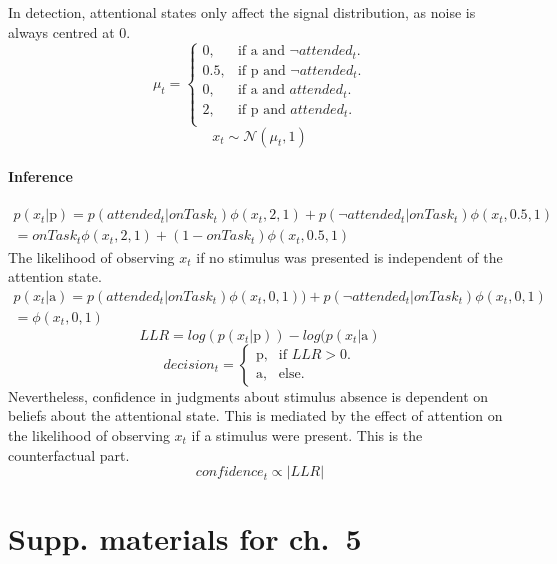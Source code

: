 \documentclass[12pt,twoside]{reedthesis}
\begin{document}
In detection, attentional states only affect the signal distribution, as noise is always centred at 0.
\begin{equation}
  \mu_t=\begin{cases}
    0, & \text{if a and $\neg attended_t$}.\\
    0.5, & \text{if p and $\neg attended_t$}.\\
    0, & \text{if a and $attended_t$}.\\
    2, & \text{if p and $attended_t$}.\\
  \end{cases}
\end{equation}
\begin{equation}
   x_t \sim \mathcal{N}(\mu_t,1)    
\end{equation}
\hypertarget{inference-7}{%
\subsubsection*{Inference}\label{inference-7}}
\begin{equation}
\begin{aligned}
    p(x_t | \text{p}) = p(attended_t | onTask_t) \phi(x_t,2,1) + p(\neg attended_t|onTask_t) \phi(x_t,0.5,1)\\
    = onTask_t \phi(x_t,2,1) + (1-onTask_t) \phi(x_t,0.5,1)
    \end{aligned}
\end{equation}
The likelihood of observing \(x_t\) if no stimulus was presented is independent of the attention state.
\begin{equation}
\begin{aligned}
    p(x_t | \text{a}) = p(attended_t | onTask_t) \phi(x_t,0,1)) + p(\neg attended_t | onTask_t) \phi(x_t,0,1)\\
    = \phi(x_t,0,1)
    \end{aligned}
\end{equation}
\begin{equation}
LLR = log(p(x_t | \text{p}))-log(p(x_t | \text{a})
\end{equation}
\begin{equation}
  decision_t=\begin{cases}
    \text{p}, & \text{if } LLR>0.\\
   \text{a}, & \text{else}.
    
  \end{cases}
\end{equation}
Nevertheless, confidence in judgments about stimulus absence is dependent on beliefs about the attentional state. This is mediated by the effect of attention on the likelihood of observing \(x_t\) if a stimulus were present. This is the counterfactual part.
\begin{equation}
confidence_t \propto |LLR|
\end{equation}
\hypertarget{supp.-materials-for-ch.-5}{%
\chapter{Supp. materials for ch.~5}\label{supp.-materials-for-ch.-5}}
\end{document}
